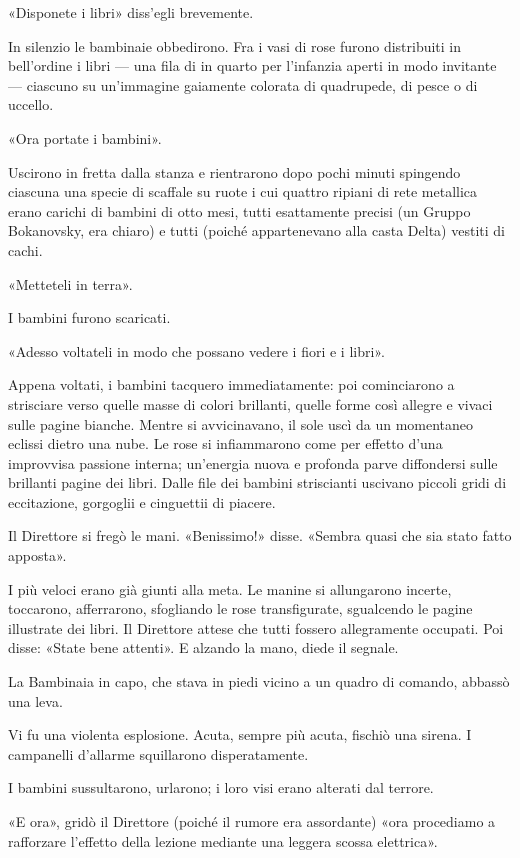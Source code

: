 \documentclass[
a5paper, %
10pt, %
twoside, 
onecolumn, %
openany, %
]{memoir}
\begin{document}
«Disponete i libri» diss’egli brevemente.

In silenzio le bambinaie obbedirono. Fra i vasi di rose furono distribuiti in bell’ordine i libri — una fila di in quarto per l’infanzia aperti in modo invitante — ciascuno su un’immagine gaiamente colorata di quadrupede, di pesce o di uccello.

«Ora portate i bambini».

Uscirono in fretta dalla stanza e rientrarono dopo pochi minuti spingendo ciascuna una specie di scaffale su ruote i cui quattro ripiani di rete metallica erano carichi di bambini di otto mesi, tutti esattamente precisi (un Gruppo Bokanovsky, era chiaro) e tutti (poiché appartenevano alla casta Delta) vestiti di cachi.

«Metteteli in terra».

I bambini furono scaricati.

«Adesso voltateli in modo che possano vedere i fiori e i libri».

Appena voltati, i bambini tacquero immediatamente: poi cominciarono a strisciare verso quelle masse di colori brillanti, quelle forme così allegre e vivaci sulle pagine bianche. Mentre si avvicinavano, il sole uscì da un momentaneo eclissi dietro una nube. Le rose si infiammarono come per effetto d’una improvvisa passione interna; un’energia nuova e profonda parve diffondersi sulle brillanti pagine dei libri. Dalle file dei bambini striscianti uscivano piccoli gridi di eccitazione, gorgoglii e cinguettii di piacere.

Il Direttore si fregò le mani. «Benissimo!» disse. «Sembra quasi che sia stato fatto apposta».

I più veloci erano già giunti alla meta. Le manine si allungarono incerte, toccarono, afferrarono, sfogliando le rose transfigurate, sgualcendo le pagine illustrate dei libri. Il Direttore attese che tutti fossero allegramente occupati. Poi disse: «State bene attenti». E alzando la mano, diede il segnale.

La Bambinaia in capo, che stava in piedi vicino a un quadro di comando, abbassò una leva.

Vi fu una violenta esplosione. Acuta, sempre più acuta, fischiò una sirena. I campanelli d’allarme squillarono disperatamente.

I bambini sussultarono, urlarono; i loro visi erano alterati dal terrore.

«E ora», gridò il Direttore (poiché il rumore era assordante) «ora procediamo a rafforzare l’effetto della lezione mediante una leggera scossa elettrica».
\end{document}
